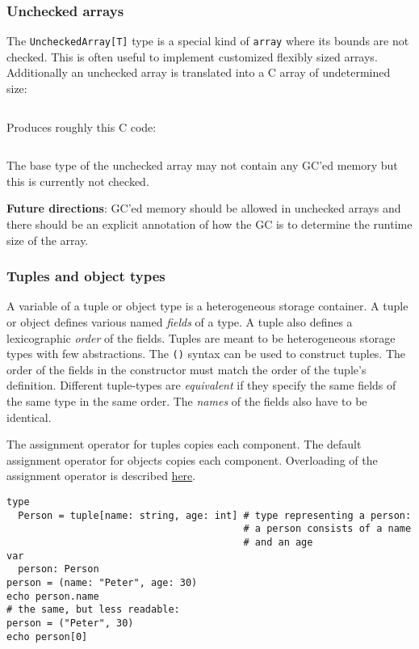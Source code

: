 \hypertarget{unchecked-arrays}{%
\subsubsection{Unchecked arrays}\label{unchecked-arrays}}

The \texttt{UncheckedArray{[}T{]}} type is a special kind of
\texttt{array} where its bounds are not checked. This is often useful to
implement customized flexibly sized arrays. Additionally an unchecked
array is translated into a C array of undetermined size:

\begin{verbatim}
\end{verbatim}

Produces roughly this C code:

\begin{verbatim}
\end{verbatim}

The base type of the unchecked array may not contain any GC'ed memory
but this is currently not checked.

\textbf{Future directions}: GC'ed memory should be allowed in unchecked
arrays and there should be an explicit annotation of how the GC is to
determine the runtime size of the array.

\hypertarget{tuples-and-object-types}{%
\subsubsection{Tuples and object types}\label{tuples-and-object-types}}

A variable of a tuple or object type is a heterogeneous storage
container. A tuple or object defines various named \emph{fields} of a
type. A tuple also defines a lexicographic \emph{order} of the fields.
Tuples are meant to be heterogeneous storage types with few
abstractions. The \texttt{()} syntax can be used to construct tuples.
The order of the fields in the constructor must match the order of the
tuple's definition. Different tuple-types are \emph{equivalent} if they
specify the same fields of the same type in the same order. The
\emph{names} of the fields also have to be identical.

The assignment operator for tuples copies each component. The default
assignment operator for objects copies each component. Overloading of
the assignment operator is described
\href{manual_experimental.html\#type-bound-operations}{here}.

\begin{verbatim}
type
  Person = tuple[name: string, age: int] # type representing a person:
                                         # a person consists of a name
                                         # and an age
var
  person: Person
person = (name: "Peter", age: 30)
echo person.name
# the same, but less readable:
person = ("Peter", 30)
echo person[0]
\end{verbatim}

